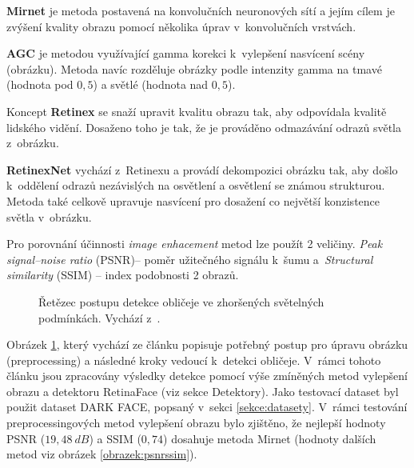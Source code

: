 \textbf{Mirnet} je metoda postavená na konvolučních neuronových sítí a jejím cílem je zvýšení kvality obrazu pomocí několika úprav v~konvolučních vrstvách.

\textbf{AGC} je metodou využívající gamma korekci k~vylepšení nasvícení scény (obrázku). Metoda navíc rozděluje obrázky podle intenzity gamma na tmavé (hodnota pod $0,5$) a světlé (hodnota nad $0,5$).

Koncept \textbf{Retinex} se snaží upravit kvalitu obrazu tak, aby odpovídala kvalitě lidského vidění. Dosaženo toho je tak, že je prováděno odmazávání odrazů světla z~obrázku.

\textbf{RetinexNet} vychází z~Retinexu a provádí dekompozici obrázku tak, aby došlo k~oddělení odrazů nezávislých na osvětlení a osvětlení se známou strukturou. Metoda také celkově upravuje nasvícení pro dosažení co největší konzistence světla v~obrázku.

Pro porovnání účinnosti \emph{image enhacement} metod lze použít 2 veličiny. \emph{Peak signal--noise ratio} (PSNR)-- poměr užitečného signálu k~šumu a~\emph{Structural similarity} (SSIM) -- index podobnosti 2 obrazů.

\begin{figure}[H]
  \begin{center}
  \label{obrazek:iepostup}
  \caption{Řetězec postupu detekce obličeje ve zhoršených světelných podmínkách. Vychází z~\cite{lowLightFdReview}.}
  \end{center}
\end{figure}

Obrázek \ref{obrazek:iepostup}, který vychází ze článku \cite{lowLightFdReview} popisuje potřebný postup pro úpravu obrázku (preprocessing) a následné kroky vedoucí k~detekci obličeje. V~rámci tohoto článku jsou zpracovány výsledky detekce pomocí výše zmíněných metod vylepšení obrazu a detektoru RetinaFace (viz sekce Detektory). Jako testovací dataset byl použit dataset DARK FACE, popsaný v~sekci \ref{sekce:datasety}. V~rámci testování preprocessingových metod vylepšení obrazu bylo zjištěno, že nejlepší hodnoty PSNR ($19,48\:dB$) a SSIM ($0,74$) dosahuje metoda Mirnet (hodnoty dalších metod viz obrázek \ref{obrazek:psnrssim}).

